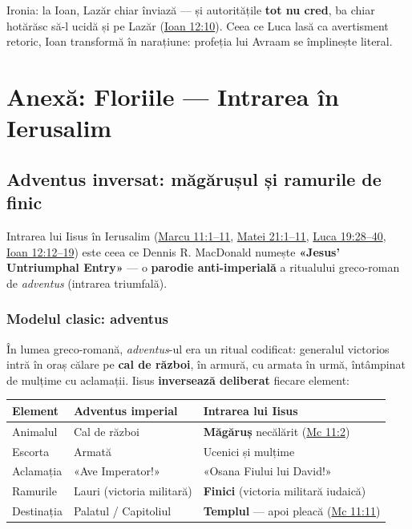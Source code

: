 \documentclass[12pt,a4paper,twoside,openany]{book}
\begin{document}
Ironia: la Ioan, Lazăr chiar înviază — și autoritățile \textbf{tot nu cred}, ba chiar hotărăsc să-l ucidă și pe Lazăr (\href{https://bibliaortodoxa.ro/carte.php?id=35\&cap=12\#10}{Ioan 12:10}). Ceea ce Luca lasă ca avertisment retoric, Ioan transformă în narațiune: profeția lui Avraam se împlinește literal.


\chapter{Anexă: Floriile — Intrarea în Ierusalim}\label{floriile}

\section{Adventus inversat: măgărușul și ramurile de finic}

Intrarea lui Iisus în Ierusalim (\href{https://bibliaortodoxa.ro/carte.php?id=53\&cap=11\#1}{Marcu 11:1--11}, \href{https://bibliaortodoxa.ro/carte.php?id=55\&cap=21\#1}{Matei 21:1--11}, \href{https://bibliaortodoxa.ro/carte.php?id=48\&cap=19\#28}{Luca 19:28--40}, \href{https://bibliaortodoxa.ro/carte.php?id=35\&cap=12\#12}{Ioan 12:12--19}) este ceea ce Dennis R. MacDonald numește \textbf{«Jesus' Untriumphal Entry»} — o \textbf{parodie anti-imperială} a ritualului greco-roman de \textit{adventus} (intrarea triumfală).

\subsection{Modelul clasic: adventus}

În lumea greco-romană, \textit{adventus}-ul era un ritual codificat: generalul victorios intră în oraș călare pe \textbf{cal de război}, în armură, cu armata în urmă, întâmpinat de mulțime cu aclamații. Iisus \textbf{inversează deliberat} fiecare element:

\begin{center}
\small
\begin{tabularx}{\textwidth}{L{3cm}L{5cm}X}
\toprule
{}
\textbf{Element} & \textbf{Adventus imperial} & \textbf{Intrarea lui Iisus} \\
\midrule
Animalul & Cal de război & \textbf{Măgăruș} necălărit (\href{https://bibliaortodoxa.ro/carte.php?id=53\&cap=11\#2}{Mc 11:2}) \\
Escorta & Armată & Ucenici și mulțime \\
Aclamația & «Ave Imperator!» & «Osana Fiului lui David!» \\
Ramurile & Lauri (victoria militară) & \textbf{Finici} (victoria militară iudaică) \\
Destinația & Palatul / Capitoliul & \textbf{Templul} — apoi pleacă (\href{https://bibliaortodoxa.ro/carte.php?id=53\&cap=11\#11}{Mc 11:11}) \\
\bottomrule
\end{tabularx}
\end{center}
\end{document}
